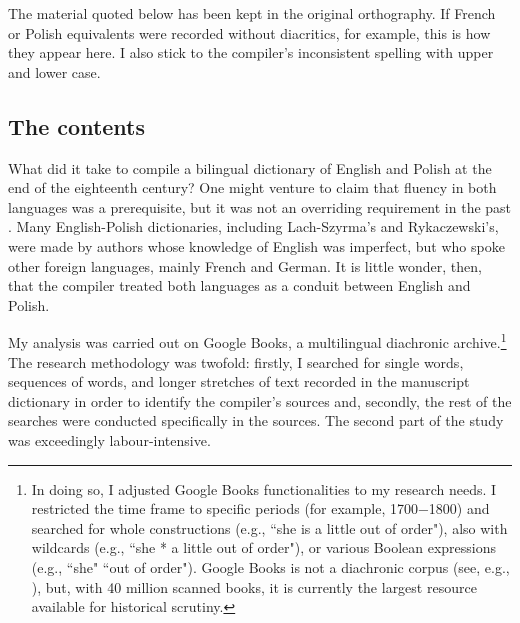 \documentclass[output=paper,colorlinks,citecolor=brown,arabicfont,chinesefont]{langscibook}
\begin{document}
The material quoted below has been kept in the original orthography. If French or Polish equivalents were recorded without diacritics, for example, this is how they appear here. I also stick to the compiler’s inconsistent spelling with upper and lower case.

\subsection{The contents}

What did it take to compile a bilingual dictionary of English and Polish at the end of the eighteenth century? One might venture to claim that fluency in both languages was a prerequisite, but it was not an overriding requirement in the past \citep[554]{Podhajecka_miroslawa2016a}. Many English-Polish dictionaries, including Lach-Szyrma’s and Rykaczewski’s, were made by authors whose knowledge of English was imperfect, but who spoke other foreign languages, mainly French and German. It is little wonder, then, that the compiler treated both languages as a conduit between English and Polish.

My analysis was carried out on Google Books, a multilingual diachronic archive.\footnote{In doing so, I adjusted Google Books functionalities to my research needs. I restricted the time frame to specific periods (for example, 1700−1800) and searched for whole constructions (e.g., “she is a little out of order"), also with wildcards (e.g., “she * a little out of order"), or various Boolean expressions (e.g., “she" “out of order"). Google Books is not a diachronic corpus (see, e.g., \citealt{Podhajecka_miroslawa2011}), but, with 40 million scanned books, it is currently the largest resource available for historical scrutiny.} The research methodology was twofold: firstly, I searched for single words, sequences of words, and longer stretches of text recorded in the manuscript dictionary in order to identify the compiler’s sources and, secondly, the rest of the searches were conducted specifically in the sources. The second part of the study was exceedingly labour-intensive.
\end{document}
